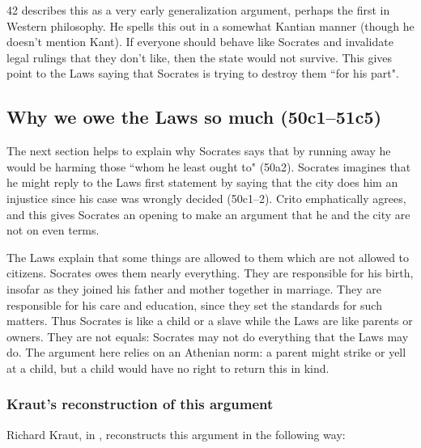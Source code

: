 \documentclass[12pt,letterpaper]{article}
\begin{document}
\cite{kraut-socrates-state-1984} 42 describes this as a very early generalization argument, perhaps the first in Western philosophy. He spells this out in a somewhat Kantian manner (though he doesn't mention Kant). If everyone should behave like Socrates and invalidate legal rulings that they don't like, then the state would not survive. This gives point to the Laws saying that Socrates is trying to destroy them ``for his part".

\subsection*{Why we owe the Laws so much (50c1--51c5)}

The next section helps to explain why Socrates says that by running away he would be harming those ``whom he least ought to" (50a2). Socrates imagines that he might reply to the Laws first statement by saying that the city does him an injustice since his case was wrongly decided (50c1--2). Crito emphatically agrees, and this gives Socrates an opening to make an argument that he and the city are not on even terms.

The Laws explain that some things are allowed to them which are not allowed
to citizens. Socrates owes them nearly everything. They are responsible
for his birth, insofar as they joined his father and mother together in
marriage. They are responsible for his care and education, since they set
the standards for such matters. Thus Socrates is like a child or a slave
while the Laws are like parents or owners. They are not equals: Socrates
may not do everything that the Laws may do. The argument here relies on an
Athenian norm: a parent might strike or yell at a child, but a child would
have no right to return this in kind.

\subsubsection*{Kraut's reconstruction of this argument}

Richard Kraut, in \cite{kraut-socrates-state-1984}, reconstructs this argument in the following way:
\end{document}
